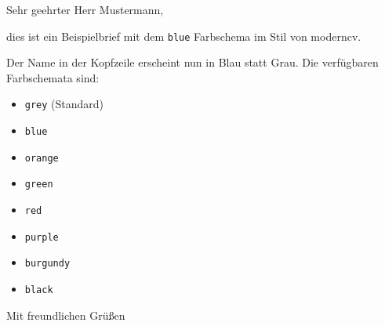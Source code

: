 \documentclass[modern, blue, footercenter]{../onlinebrief24}
\begin{document}
\begin{letter}{}
    \opening{Sehr geehrter Herr Mustermann,}
    
    dies ist ein Beispielbrief mit dem \texttt{blue} Farbschema im Stil von moderncv.
    
    Der Name in der Kopfzeile erscheint nun in Blau statt Grau. Die verfügbaren Farbschemata sind:
    \begin{itemize}
        \item \texttt{grey} (Standard)
        \item \texttt{blue}
        \item \texttt{orange}
        \item \texttt{green}
        \item \texttt{red}
        \item \texttt{purple}
        \item \texttt{burgundy}
        \item \texttt{black}
    \end{itemize}
    
    \closing{Mit freundlichen Grüßen}
\end{letter}
\end{document}
